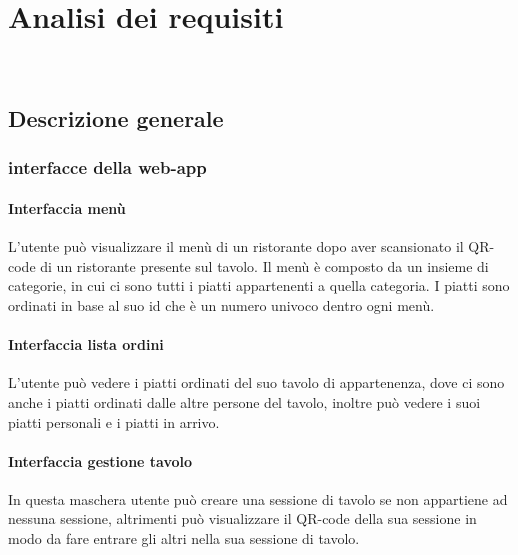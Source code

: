 
\chapter{Analisi dei requisiti}
\label{cap:analisi dei requisiti}

\\

\section{Descrizione generale}
\subsection{interfacce della web-app}
\subsubsection{Interfaccia menù}
L'utente può visualizzare il menù di un ristorante dopo aver scansionato il QR-code di un ristorante presente sul tavolo. Il menù è composto da un insieme di categorie, in cui ci sono tutti i piatti appartenenti a quella categoria. I piatti sono ordinati in base al suo id che è un numero univoco dentro ogni menù.
\subsubsection{Interfaccia lista ordini}
L'utente può vedere i piatti ordinati del suo tavolo di appartenenza, dove ci sono anche i piatti ordinati dalle altre persone del tavolo, inoltre può vedere i suoi piatti personali e i piatti in arrivo.
\subsubsection{Interfaccia gestione tavolo}
In questa maschera utente può creare una sessione di tavolo se non appartiene ad nessuna sessione, altrimenti può visualizzare il QR-code della sua sessione in modo da fare entrare gli altri nella sua sessione di tavolo.
